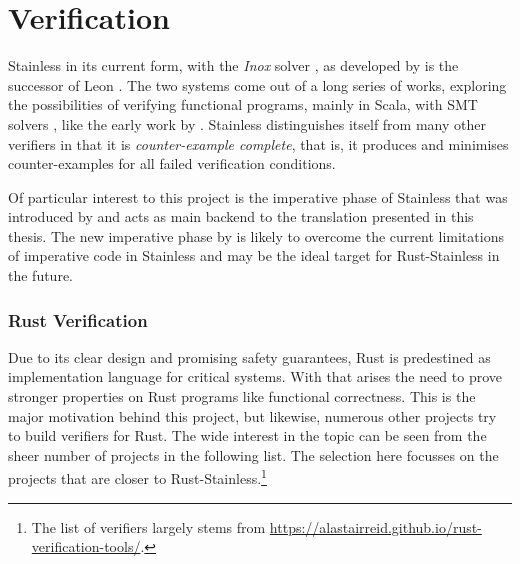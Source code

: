 \section{Verification}

Stainless in its current form, with the \emph{Inox} solver \cite{inox}, as
developed by \citet*{stainless} is the successor of Leon \cite{leon}. The two
systems come out of a long series of works, exploring the possibilities of
verifying functional programs, mainly in Scala, with SMT solvers \cite{smt},
like the early work by \citet{smrp}. Stainless distinguishes itself from many
other verifiers in that it is \emph{counter-example complete}, that is, it
produces and minimises counter-examples for all failed verification conditions.

Of particular interest to this project is the imperative phase of Stainless that
was introduced by \citet{regb} and acts as main backend to the translation
presented in this thesis. The new imperative phase by \citet{new-imperative} is
likely to overcome the current limitations of imperative code in Stainless and
may be the ideal target for Rust-Stainless in the future.

\subsubsection{Rust Verification}

Due to its clear design and promising safety guarantees, Rust is predestined as
implementation language for critical systems. With that arises the need to prove
stronger properties on Rust programs like functional correctness. This is the
major motivation behind this project, but likewise, numerous other projects try
to build verifiers for Rust. The wide interest in the topic can be seen from the
sheer number of projects in the following list. The selection here focusses on
the projects that are closer to Rust-Stainless.\footnote{The list of verifiers
largely stems from
\url{https://alastairreid.github.io/rust-verification-tools/}.}

